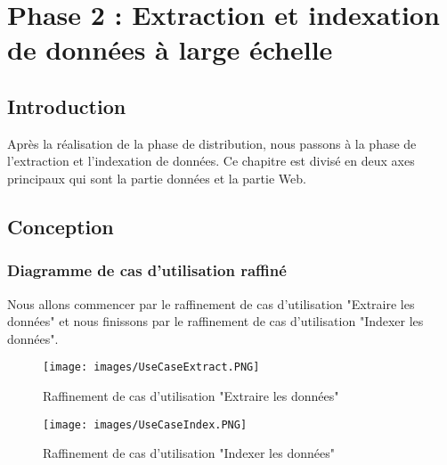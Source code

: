 \chapter{Phase 2 : Extraction et indexation de données à large échelle}

\section*{Introduction}
Après la réalisation de la phase de distribution, nous passons à la phase de l’extraction et l'indexation de données.  
Ce chapitre est divisé en deux axes principaux qui sont la  partie données et la  partie Web.  
\section{Conception}
\subsection{Diagramme de cas d'utilisation raffiné}
Nous allons commencer par le raffinement de cas d'utilisation "Extraire les données" et nous finissons par le raffinement de cas d'utilisation "Indexer les données".
\begin{figure}[H]
\centering
\texttt{[image: images/UseCaseExtract.PNG]}
\caption{Raffinement de cas d'utilisation "Extraire les données"}
\end{figure}

\begin{figure}[H]
\centering
\texttt{[image: images/UseCaseIndex.PNG]}
\caption{Raffinement de cas d'utilisation "Indexer les données"}
\end{figure}
\newpage

